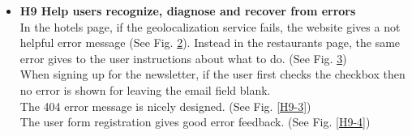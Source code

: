 \begin{itemize}
\begin{figure}[!ht]
\begin{minipage}{\linewidth}
                \captionsetup{justification=centering}
                \caption{}
                \label{H8-2}
            \end{minipage}
        \end{figure}
    \item \textbf{H9 Help users recognize, diagnose and recover from errors}\\
        In the hotels page, if the geolocalization service fails, the website gives a not helpful error message (See Fig. \ref{H9-1}). Instead in the restaurants page, the same error gives to the user instructions about what to do. (See Fig. \ref{H9-2})\\
        When signing up for the newsletter, if the user first checks the checkbox then no error is shown for leaving the email field blank.\\
        The 404 error message is nicely designed. (See Fig. \ref{H9-3})\\
        The user form registration gives good error feedback. (See Fig. \ref{H9-4})
        \begin{figure}[!ht]
            \begin{minipage}{\linewidth}
                \centering
                \captionsetup{justification=centering}
                \caption{}
                \label{H9-1}
            \end{minipage}
        \end{figure}
        \begin{figure}[!ht]
            \begin{minipage}{\linewidth}
                \centering
                \captionsetup{justification=centering}
                \caption{}
                \label{H9-2}
            \end{minipage}
        \end{figure}

\end{itemize}
